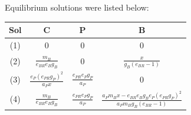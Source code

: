 \documentclass[a4paper,11pt]{article}
\begin{document}
    Equilibrium solutions were listed below:
    \begin{center}
        \begin{tabular}{c|ccc}\hline
            Sol & C & P & B\\\hline
            (1) & 0 & 0 & 0\\
            (2) & $\frac{m_B}{e_{BR}e_B g_B}$ & 0 & $\frac{x}{g_B(e_{BR} - 1)}$\\
            (3) & $\frac{e_P(e_{PR}g_P)^2}{a_P x}$ & $\frac{e_{PR}e_Pg_P}{a_P}$ & 0\\
            (4) & $\frac{m_B}{e_{BR}e_B g_B}$ & $\frac{e_{PR}e_P g_P}{a_P}$ & $\frac{a_P m_B x - e_{BR}e_B g_B e_P(e_{PR}g_P)^2}{a_P m_B g_B(e_{BR}-1)}$\\\hline
        \end{tabular}
    \end{center}
    
\end{document}
